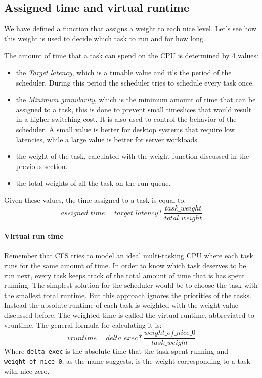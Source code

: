 \subsection{Assigned time and virtual runtime}
We have defined a function that assigns a weight to each nice level. Let's see how this weight is used to decide which task to run and for how long.

The amount of time that a task can spend on the CPU is determined by 4 values:
\begin{itemize}
    \item the \textit{Target latency}, which is a tunable value and it's the period of the scheduler. During this period the scheduler tries to schedule every task once. 
    \item the \textit{Minimum granularity}, which is the minimum amount of time that can be assigned to a task, this is done to prevent small timeslices that would result in a higher switching cost. It is also used to control the behavior of the scheduler. A small value is better for desktop systems that require low latencies, while a large value is better for server workloads.
    \item the weight of the task, calculated with the weight function discussed in the previous section.
    \item the total weights of all the task on the run queue.
\end{itemize}
Given these values, the time assigned to a task is equal to: 
\begin{equation} \label{eq:2.4}
    assigned\_time = target\_latency * \frac{task\_weight}{total\_weight}
\end{equation}

\paragraph{Virtual run time}
Remember that CFS tries to model an ideal multi-tasking CPU where each task runs for the same amount of time. In order to know which task deserves to be run next, every task keeps track of the total amount of time that is has spent running. The simplest solution for the scheduler would be to choose the task with the smallest total runtime. But this approach ignores the priorities of the tasks. Instead the absolute runtime of each task is weighted with the weight value discussed before. The weighted time is called the virtual runtime, abbreviated to vruntime. The general formula for calculating it is:
\begin{equation}
    vruntime = delta\_exec * \frac{weight\_of\_nice\_0}{task\_weight}
\end{equation}
Where \verb|delta_exec| is the absolute time that the task spent running and \verb|weight_of_nice_0|, as the name suggests, is the weight corresponding to a task with nice zero.

